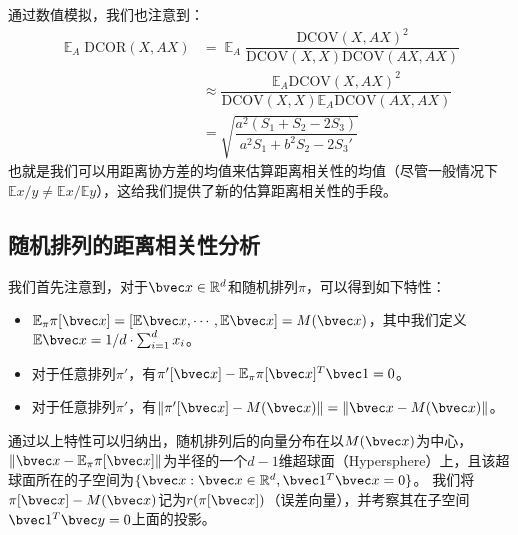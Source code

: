 通过数值模拟，我们也注意到：
\begin{equation}
\label{eq:ss-perm:linear-dcor-estimation}
\begin{split}
    \mathop{\mathbb E}_A \text{DCOR}(X, AX) & = \mathop{\mathbb E}_A \dfrac{\text{DCOV}(X, AX)^2}{\text{DCOV}(X, X)\text{DCOV}(AX, AX)}
    \\
    &\approx \dfrac{\mathbb E_A \text{DCOV}(X, AX)^2}{\text{DCOV}(X, X) \mathbb E_A \text{DCOV}(AX, AX)}
    \\
    &= \sqrt{\dfrac{a^2(S_1 + S_2 - 2S_3)}{a^2S_1 + b^2S_2 - 2S_3'}}
\end{split}
\end{equation}
%
也就是我们可以用距离协方差的均值来估算距离相关性的均值（尽管一般情况下$\mathbb E x/y \ne \mathbb E x/\mathbb E y$），这给我们提供了新的估算距离相关性的手段。
%


\subsection{随机排列的距离相关性分析}
我们首先注意到，对于$\bvec x \in \mathbb R^d$和随机排列$\pi$，可以得到如下特性：
\begin{itemize}
    \item $\mathbb E_\pi \pi[\bvec x] = [\mathbb E\bvec x, \cdots, \mathbb E\bvec x] = M(\bvec x)$，其中我们定义$\mathbb E\bvec x = 1/d \cdot \sum_{i=1}^d x_i$。
    \item 对于任意排列$\pi'$，有$\pi'[\bvec x] - \mathbb E_{\pi}\pi[\bvec x]^T \bvec 1 = 0$。
    \item 对于任意排列$\pi'$，有$\Vert \pi'[\bvec x] - M(\bvec x)\Vert = \Vert \bvec x - M(\bvec x)\Vert$。
\end{itemize}
%
通过以上特性可以归纳出，随机排列后的向量分布在以$M(\bvec x)$为中心，$\Vert \bvec x - \mathbb E_\pi \pi[\bvec x]\Vert$为半径的一个$d - 1$维超球面（Hypersphere）上，且该超球面所在的子空间为$\{\bvec x: \bvec x \in \mathbb R^d, \bvec 1^T\bvec x = 0\}$。
%
我们将$\pi[\bvec x] - M(\bvec x)$记为$r(\pi[\bvec x])$（误差向量），并考察其在子空间$\bvec 1^T \bvec y = 0$上面的投影。
%

